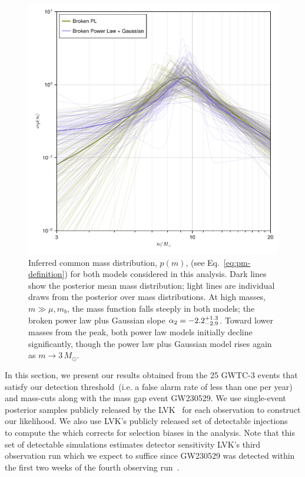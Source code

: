 \documentclass[modern]{aastex631}
\begin{document}
\begin{figure}
    \includegraphics[width=\columnwidth]{figures/pm_traces_including_230529.pdf}
    \caption{\label{fig:pm-traces_including_230529} Inferred common mass distribution, $p(m)$,
    (see Eq.~\eqref{eq:pm-definition}) for both models considered in this
    analysis.  Dark lines show the posterior mean mass distribution; light lines
    are individual draws from the posterior over mass distributions.  At high
    masses, $m \gg \mu, m_b$, the mass function falls steeply in both models;
    the broken power law plus Gaussian slope $\alpha_2 = -2.2^{+1.3}_{-2.9}$.
    Toward lower masses from the peak, both power law models initially decline
    significantly, though the power law plus Gaussian model rises again as $m
    \to 3 \, M_\odot$.}
\end{figure}

In this section, we present our results obtained from the 25 GWTC-3 events that
satisfy our detection threshold~(i.e. a false alarm rate of less than one per
year) and mass-cuts along with the mass gap event GW230529. We use single-event
posterior samples publicly released by the LVK~\citep{gwosco3, gwosco4} for each
observation to construct our likelihood. We also use LVK's publicly released set
of detectable injections~\citep{gwosco3} to compute the
 which corrects for selection biases in the
analysis. Note that this set of detectable simulations estimates detector
sensitivity  LVK's third observation run
which we expect to suffice since GW230529 was detected within the first two
weeks of the fourth observing run~\citep{LIGOScientific:2024elc}.
\end{document}
